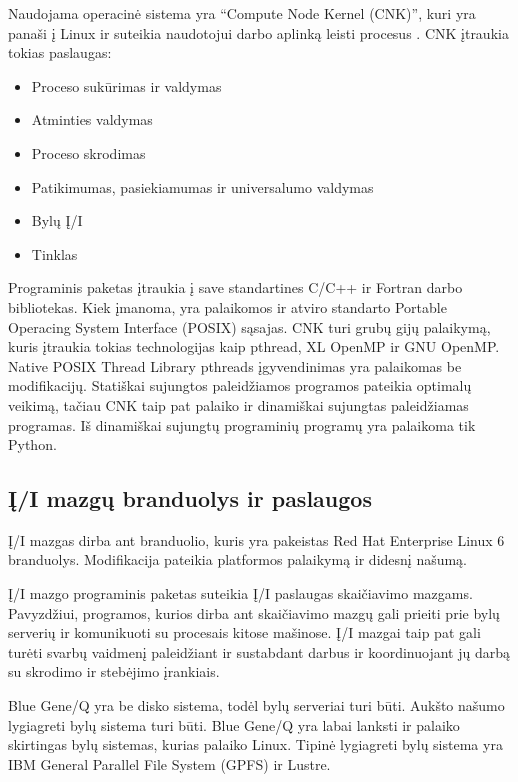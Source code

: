 Naudojama operacinė sistema yra ``Compute Node Kernel (CNK)'', kuri yra panaši į Linux ir suteikia naudotojui darbo aplinką leisti procesus \cite{milano2013ibm}.
CNK įtraukia tokias paslaugas:

\begin{itemize}
    \item Proceso sukūrimas ir valdymas
    \item Atminties valdymas
    \item Proceso skrodimas
    \item Patikimumas, pasiekiamumas ir universalumo valdymas
    \item Bylų Į/I
    \item Tinklas
\end{itemize}

Programinis paketas įtraukia į save standartines C/C++ ir Fortran darbo bibliotekas.
Kiek įmanoma, yra palaikomos ir atviro standarto Portable Operacing System Interface (POSIX) sąsajas.
CNK turi grubų gijų palaikymą, kuris įtraukia tokias technologijas kaip pthread, XL OpenMP ir GNU OpenMP.
Native POSIX Thread Library pthreads įgyvendinimas yra palaikomas be modifikacijų.
Statiškai sujungtos paleidžiamos programos pateikia optimalų veikimą, tačiau CNK taip pat palaiko ir dinamiškai sujungtas paleidžiamas programas.
Iš dinamiškai sujungtų programinių programų yra palaikoma tik Python.

\subsection{Į/I mazgų branduolys ir paslaugos}

Į/I mazgas dirba ant branduolio, kuris yra pakeistas Red Hat Enterprise Linux 6 branduolys.
Modifikacija pateikia platformos palaikymą ir didesnį našumą.

Į/I mazgo programinis paketas suteikia Į/I paslaugas skaičiavimo mazgams.
Pavyzdžiui, programos, kurios dirba ant skaičiavimo mazgų gali prieiti prie bylų serverių ir komunikuoti su procesais kitose mašinose.
Į/I mazgai taip pat gali turėti svarbų vaidmenį paleidžiant ir sustabdant darbus ir koordinuojant jų darbą su skrodimo ir stebėjimo įrankiais.

Blue Gene/Q yra be disko sistema, todėl bylų serveriai turi būti.
Aukšto našumo lygiagreti bylų sistema turi būti.
Blue Gene/Q yra labai lanksti ir palaiko skirtingas bylų sistemas, kurias palaiko Linux.
Tipinė lygiagreti bylų sistema yra IBM General Parallel File System (GPFS) ir Lustre.

